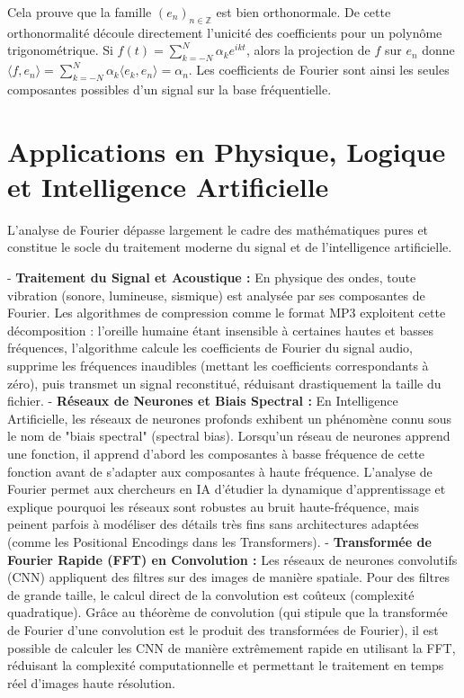 \documentclass[12pt,a4paper]{article}
\begin{document}
Cela prouve que la famille $(e_n)_{n \in \mathbb{Z}}$ est bien orthonormale. De cette orthonormalité découle directement l'unicité des coefficients pour un polynôme trigonométrique. Si $f(t) = \sum_{k=-N}^N \alpha_k e^{ikt}$, alors la projection de $f$ sur $e_n$ donne $\langle f, e_n \rangle = \sum_{k=-N}^N \alpha_k \langle e_k, e_n \rangle = \alpha_n$. Les coefficients de Fourier sont ainsi les seules composantes possibles d'un signal sur la base fréquentielle.

\section{Applications en Physique, Logique et Intelligence Artificielle}

L'analyse de Fourier dépasse largement le cadre des mathématiques pures et constitue le socle du traitement moderne du signal et de l'intelligence artificielle.

- \textbf{Traitement du Signal et Acoustique :} En physique des ondes, toute vibration (sonore, lumineuse, sismique) est analysée par ses composantes de Fourier. Les algorithmes de compression comme le format MP3 exploitent cette décomposition : l'oreille humaine étant insensible à certaines hautes et basses fréquences, l'algorithme calcule les coefficients de Fourier du signal audio, supprime les fréquences inaudibles (mettant les coefficients correspondants à zéro), puis transmet un signal reconstitué, réduisant drastiquement la taille du fichier.
- \textbf{Réseaux de Neurones et Biais Spectral :} En Intelligence Artificielle, les réseaux de neurones profonds exhibent un phénomène connu sous le nom de "biais spectral" (spectral bias). Lorsqu'un réseau de neurones apprend une fonction, il apprend d'abord les composantes à basse fréquence de cette fonction avant de s'adapter aux composantes à haute fréquence. L'analyse de Fourier permet aux chercheurs en IA d'étudier la dynamique d'apprentissage et explique pourquoi les réseaux sont robustes au bruit haute-fréquence, mais peinent parfois à modéliser des détails très fins sans architectures adaptées (comme les Positional Encodings dans les Transformers).
- \textbf{Transformée de Fourier Rapide (FFT) en Convolution :} Les réseaux de neurones convolutifs (CNN) appliquent des filtres sur des images de manière spatiale. Pour des filtres de grande taille, le calcul direct de la convolution est coûteux (complexité quadratique). Grâce au théorème de convolution (qui stipule que la transformée de Fourier d'une convolution est le produit des transformées de Fourier), il est possible de calculer les CNN de manière extrêmement rapide en utilisant la FFT, réduisant la complexité computationnelle et permettant le traitement en temps réel d'images haute résolution.
\end{document}
